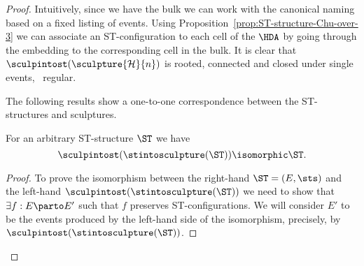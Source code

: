\begin{proof}
    Intuitively, since we have the bulk we can work with the canonical naming based on a fixed listing of events. Using Proposition~\ref{prop:ST-structure-Chu-over-3} we can associate an ST-configuration to each cell of the $\HDA$ by going through the embedding to the corresponding cell in the bulk. It is clear that $\sculpintost(\sculpture{\mathcal{H}}{n})$ is rooted, connected and closed under single events, \ie~regular.

    The following results show a one-to-one correspondence between the ST-structures and sculptures.

    \begin{proposition}
        \label{prop:ST-to-Sculpture}
        For an arbitrary ST-structure $\ST$ we have
        \[
            \sculpintost(\stintosculpture(\ST))\isomorphic \ST.
        \]
    \end{proposition}

    \begin{proof}
        To prove the isomorphism between the right-hand $\ST=(E,\sts)$ and the left-hand $\sculpintost(\stintosculpture(\ST))$ we need to show that $\exists f: E \parto E'$ such that $f$ preserves ST-configurations.  
        We will consider $E'$ to be the events produced by the left-hand side of the isomorphism, precisely, by $\sculpintost(\stintosculpture(\ST))$.
    

\end{proof}
\end{proof}
